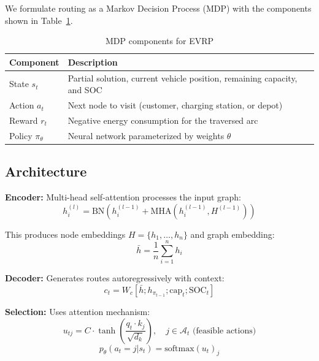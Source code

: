 \documentclass[11pt,a4paper]{article}
\begin{document}
We formulate routing as a Markov Decision Process (MDP) with the components shown in Table~\ref{tab:mdp}.

\begin{table}[H]
\centering
\caption{MDP components for EVRP}
\label{tab:mdp}
\begin{tabular}{@{}lp{10cm}@{}}
\toprule
\textbf{Component} & \textbf{Description} \\
\midrule
State $s_t$ & Partial solution, current vehicle position, remaining capacity, and SOC \\
Action $a_t$ & Next node to visit (customer, charging station, or depot) \\
Reward $r_t$ & Negative energy consumption for the traversed arc \\
Policy $\pi_\theta$ & Neural network parameterized by weights $\theta$ \\
\bottomrule
\end{tabular}
\end{table}

\subsection{Architecture}

\textbf{Encoder:} Multi-head self-attention processes the input graph:
\begin{equation}
h_i^{(l)} = \text{BN}\left( h_i^{(l-1)} + \text{MHA}\left( h_i^{(l-1)}, H^{(l-1)} \right) \right)
\end{equation}

This produces node embeddings $H = \{h_1, \ldots, h_n\}$ and graph embedding:
\begin{equation}
\bar{h} = \frac{1}{n} \sum_{i=1}^{n} h_i
\end{equation}

\textbf{Decoder:} Generates routes autoregressively with context:
\begin{equation}
c_t = W_c \left[ \bar{h}; h_{\pi_{t-1}}; \text{cap}_t; \text{SOC}_t \right]
\end{equation}

\textbf{Selection:} Uses attention mechanism:
\begin{equation}
u_{tj} = C \cdot \tanh\left( \frac{q_t \cdot k_j}{\sqrt{d_k}} \right), \quad j \in \mathcal{A}_t \text{ (feasible actions)}
\end{equation}
\begin{equation}
p_\theta(a_t = j | s_t) = \text{softmax}(u_t)_j
\end{equation}
\end{document}
